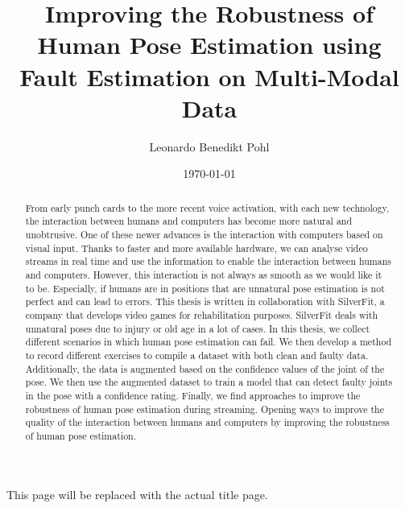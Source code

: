 
\title{Improving the Robustness of Human Pose Estimation using Fault Estimation on Multi-Modal Data}
\author{Leonardo Benedikt Pohl}

\date{\today}

This page will be replaced with the actual title page.

\clearpage

\begin{abstract}
    
  From early punch cards to the more recent voice activation, with each new technology, the interaction between humans and computers has become more natural and unobtrusive. One of these newer advances is the interaction with computers based on visual input. Thanks to faster and more available hardware, we can analyse video streams in real time and use the information to enable the interaction between humans and computers. However, this interaction is not always as smooth as we would like it to be. Especially, if humans are in positions that are unnatural pose estimation is not perfect and can lead to errors. This thesis is written in collaboration with SilverFit, a company that develops video games for rehabilitation purposes. SilverFit deals with unnatural poses due to injury or old age in a lot of cases. In this thesis, we collect different scenarios in which human pose estimation can fail. We then develop a method to record different exercises to compile a dataset with both clean and faulty data.  Additionally, the data is augmented based on the confidence values of the joint of the pose. We then use the augmented dataset to train a model that can detect faulty joints in the pose with a confidence rating. Finally, we find approaches to improve the robustness of human pose estimation during streaming. Opening ways to improve the quality of the interaction between humans and computers by improving the robustness of human pose estimation.
   
\end{abstract}
